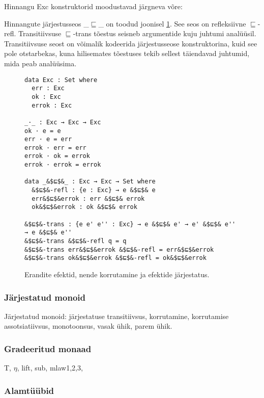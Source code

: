 \documentclass[a4paper,12pt]{article}
\begin{document}
Hinnangu Exc konstruktorid moodustavad järgneva võre:
\begin{center}
\end{center}
Hinnangute järjestusseos _$⊑$_ on toodud joonisel \ref{fig:exc.exc}. See seos on refleksiivne $⊑$-refl. Transitiivsuse $⊑$-trans tõestus seisneb argumentide kuju juhtumi analüüsil. Transitiivsuse seost on võimalik kodeerida järjestusseose konstruktorina, kuid see pole otstarbekas, kuna hilisemates tõestuses tekib sellest täiendavad juhtumid, mida peab analüüsima.
\begin{figure}
  \begin{lstlisting}
data Exc : Set where
  err : Exc
  ok : Exc
  errok : Exc
  
_·_ : Exc → Exc → Exc
ok · e = e
err · e = err
errok · err = err
errok · ok = errok
errok · errok = errok

data _&$⊑$&_ : Exc → Exc → Set where
  &$⊑$&-refl : {e : Exc} → e &$⊑$& e
  err&$⊑$&errok : err &$⊑$& errok
  ok&$⊑$&errok : ok &$⊑$& errok
  
&$⊑$&-trans : {e e' e'' : Exc} → e &$⊑$& e' → e' &$⊑$& e'' → e &$⊑$& e''
&$⊑$&-trans &$⊑$&-refl q = q
&$⊑$&-trans err&$⊑$&errok &$⊑$&-refl = err&$⊑$&errok
&$⊑$&-trans ok&$⊑$&errok &$⊑$&-refl = ok&$⊑$&errok
  \end{lstlisting}
  \caption{Erandite efektid, nende korrutamine ja efektide järjestatus.}
  \label{fig:exc.exc}
\end{figure}



\subsubsection{Järjestatud monoid}
Järjestatud monoid: järjestatuse transitiivsus, korrutamine, korrutamise assotsiatiivsus, monotoonsus, vasak ühik, parem ühik.

\subsubsection{Gradeeritud monaad}
T, $\eta$, lift, sub, mlaw1,2,3, 
\subsubsection{Alamtüübid}
\end{document}
